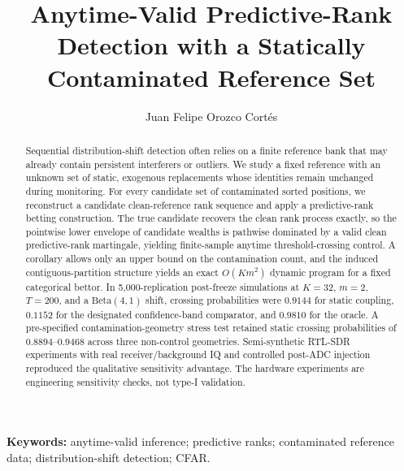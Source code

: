 \documentclass[11pt]{article}
\title{Anytime-Valid Predictive-Rank Detection with a Statically Contaminated Reference Set}
\author{Juan Felipe Orozco Cort\'es}
\date{}
\begin{document}
\maketitle

\begin{abstract}
Sequential distribution-shift detection often relies on a finite reference bank that may already contain persistent interferers or outliers. We study a fixed reference with an unknown set of static, exogenous replacements whose identities remain unchanged during monitoring. For every candidate set of contaminated sorted positions, we reconstruct a candidate clean-reference rank sequence and apply a predictive-rank betting construction. The true candidate recovers the clean rank process exactly, so the pointwise lower envelope of candidate wealths is pathwise dominated by a valid clean predictive-rank martingale, yielding finite-sample anytime threshold-crossing control. A corollary allows only an upper bound on the contamination count, and the induced contiguous-partition structure yields an exact \(O(Km^2)\) dynamic program for a fixed categorical bettor. In 5,000-replication post-freeze simulations at \(K=32\), \(m=2\), \(T=200\), and a \(\mathrm{Beta}(4,1)\) shift, crossing probabilities were \(0.9144\) for static coupling, \(0.1152\) for the designated confidence-band comparator, and \(0.9810\) for the oracle. A pre-specified contamination-geometry stress test retained static crossing probabilities of \(0.8894\)--\(0.9468\) across three non-control geometries. Semi-synthetic RTL-SDR experiments with real receiver/background IQ and controlled post-ADC injection reproduced the qualitative sensitivity advantage. The hardware experiments are engineering sensitivity checks, not type-I validation.
\end{abstract}

\noindent\textbf{Keywords:} anytime-valid inference; predictive ranks; contaminated reference data; distribution-shift detection; CFAR.












\end{document}
